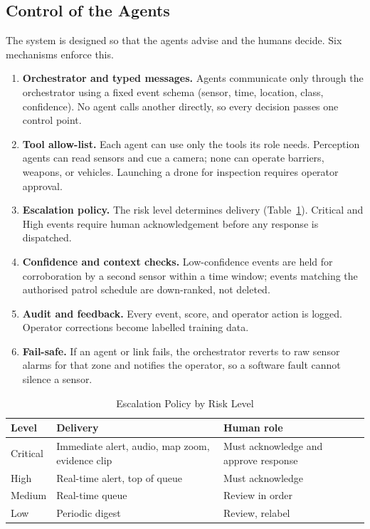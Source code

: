 \documentclass[conference]{IEEEtran}
\begin{document}
\subsection{Control of the Agents}
The system is designed so that the agents advise and the humans decide. Six mechanisms enforce this.
\begin{enumerate}
\item \textbf{Orchestrator and typed messages.} Agents communicate only through the orchestrator using a fixed event schema (sensor, time, location, class, confidence). No agent calls another directly, so every decision passes one control point.
\item \textbf{Tool allow-list.} Each agent can use only the tools its role needs. Perception agents can read sensors and cue a camera; none can operate barriers, weapons, or vehicles. Launching a drone for inspection requires operator approval.
\item \textbf{Escalation policy.} The risk level determines delivery (Table~\ref{tab:esc}). Critical and High events require human acknowledgement before any response is dispatched.
\item \textbf{Confidence and context checks.} Low-confidence events are held for corroboration by a second sensor within a time window; events matching the authorised patrol schedule are down-ranked, not deleted.
\item \textbf{Audit and feedback.} Every event, score, and operator action is logged. Operator corrections become labelled training data.
\item \textbf{Fail-safe.} If an agent or link fails, the orchestrator reverts to raw sensor alarms for that zone and notifies the operator, so a software fault cannot silence a sensor.
\end{enumerate}
\begin{table}[!t]
\caption{Escalation Policy by Risk Level}\label{tab:esc}
\centering\footnotesize
\begin{tabular}{p{1.1cm}p{3.0cm}p{3.1cm}}
\toprule
\textbf{Level} & \textbf{Delivery} & \textbf{Human role}\\
\midrule
Critical & Immediate alert, audio, map zoom, evidence clip & Must acknowledge and approve response\\
High & Real-time alert, top of queue & Must acknowledge\\
Medium & Real-time queue & Review in order\\
Low & Periodic digest & Review, relabel\\
\bottomrule
\end{tabular}
\end{table}
\end{document}
